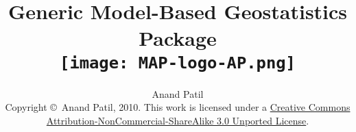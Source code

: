 \documentclass[a4paper]{report}
\begin{document}
\title{Generic Model-Based Geostatistics Package \\
\vspace{.5in}
\texttt{[image: MAP-logo-AP.png]}}
\author{Anand Patil\\ Copyright \copyright\  Anand Patil, 2010. This work is licensed under a \href{http://creativecommons.org/licenses/by-nc-sa/3.0/legalcode}{Creative Commons Attribution-NonCommercial-ShareAlike 3.0 Unported License}.}
\maketitle

\garamond

\tableofcontents



 
 
 

%   
\end{document}
